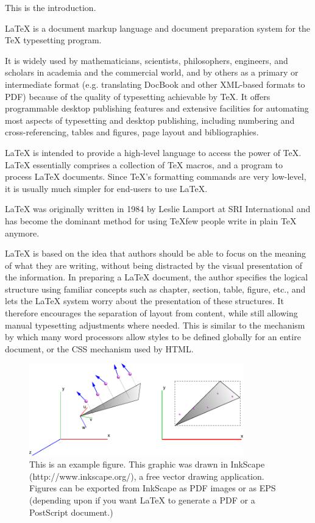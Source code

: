 
This is the introduction.

LaTeX is a document markup language and document preparation system for the TeX typesetting program.

It is widely used by mathematicians, scientists, philosophers, engineers, and scholars in academia and the commercial world, and by others as a primary or intermediate format (e.g. translating DocBook and other XML-based formats to PDF) because of the quality of typesetting achievable by TeX. It offers programmable desktop publishing features and extensive facilities for automating most aspects of typesetting and desktop publishing, including numbering and cross-referencing, tables and figures, page layout and bibliographies.

LaTeX is intended to provide a high-level language to access the power of TeX. LaTeX essentially comprises a collection of TeX macros, and a program to process LaTeX documents. Since TeX's formatting commands are very low-level, it is usually much simpler for end-users to use LaTeX.

LaTeX was originally written in 1984 by Leslie Lamport at SRI International and has become the dominant method for using TeXfew people write in plain TeX anymore.

LaTeX is based on the idea that authors should be able to focus on the meaning of what they are writing, without being distracted by the visual presentation of the information. In preparing a LaTeX document, the author specifies the logical structure using familiar concepts such as chapter, section, table, figure, etc., and lets the LaTeX system worry about the presentation of these structures. It therefore encourages the separation of layout from content, while still allowing manual typesetting adjustments where needed. This is similar to the mechanism by which many word processors allow styles to be defined globally for an entire document, or the CSS mechanism used by HTML.

\begin{figure}
\begin{center}
\includegraphics[height=40mm]{example_figure.pdf}
\captionfonts
\caption[This is a figure]{This is an example figure.  This graphic was drawn in InkScape (http://www.inkscape.org/), a free vector drawing application.  Figures can be exported from InkScape as PDF images or as EPS (depending upon if you want LaTeX to generate a PDF or a PostScript document.)}
\label{fig:inkscape-example}
\end{center}
\end{figure}

